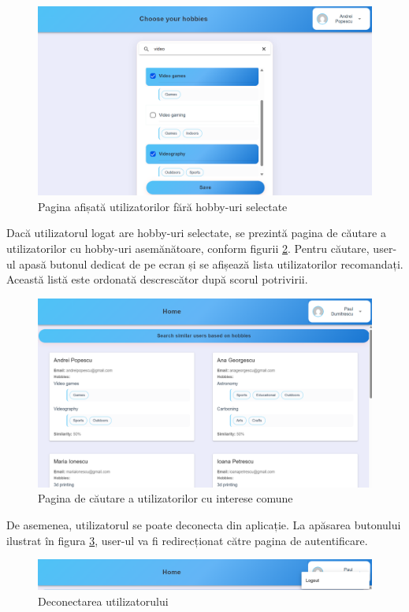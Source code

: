 \begin{figure}[htbp]
	\centering
    \includegraphics[scale=0.32]{./figures/onboarding-page.png}
	\caption{Pagina afișată utilizatorilor fără hobby-uri selectate}
	\label{FigOnboardingPage}
\end{figure}

\par
Dacă utilizatorul logat are hobby-uri selectate, se prezintă pagina de căutare a utilizatorilor cu hobby-uri asemănătoare, conform figurii \ref{FigHomePage}.
Pentru căutare, user-ul apasă butonul dedicat de pe ecran și se afișează lista utilizatorilor recomandați.
Această listă este ordonată descrescător după scorul potrivirii.

\begin{figure}[htbp]
	\centering
    \includegraphics[scale=0.33]{./figures/home-page.png}
	\caption{Pagina de căutare a utilizatorilor cu interese comune}
	\label{FigHomePage}
\end{figure}

\par
De asemenea, utilizatorul se poate deconecta din aplicație. La apăsarea butonului ilustrat în figura \ref{FigLogoutButton}, user-ul va fi redirecționat către pagina de autentificare.

\begin{figure}[htbp]
	\centering
    \includegraphics[scale=0.33]{./figures/logout-component.png}
	\caption{Deconectarea utilizatorului}
	\label{FigLogoutButton}
\end{figure}
